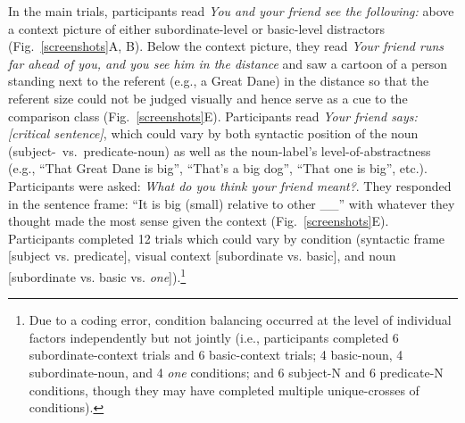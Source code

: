 \documentclass[10pt,letterpaper]{article}
\newcommand{\pt}[1]{\textcolor{Purple}{[pt: #1]}}
\begin{document}
In the main trials, participants read \emph{You and your friend see the following:} above a context picture of either subordinate-level or basic-level distractors (Fig.~\ref{screenshots}A, B). 
Below the context picture, they read \emph{Your friend runs far ahead of you, and you see him in the distance} and saw a cartoon of a person standing next to the referent (e.g., a Great Dane) in the distance so that the referent size could not be judged visually and hence serve as a cue to the comparison class (Fig.~\ref{screenshots}E). 
Participants read \emph{Your friend says: [critical sentence]}, which could vary by both syntactic position of the noun (subject-~vs.~predicate-noun) as well as the noun-label's level-of-abstractness (e.g., ``That Great Dane is big'', ``That's a big dog'', ``That one is big'', etc.). 
Participants were asked: \emph{What do you think your friend meant?}. 
They responded in the sentence frame: “It is big (small) relative to other \_\_” with whatever they thought made the most sense given the context (Fig.~\ref{screenshots}E).
Participants completed 12 trials which could vary by condition (syntactic frame [subject vs. predicate], visual context [subordinate vs. basic], and noun [subordinate vs. basic vs. \emph{one}]).\footnote{Due to a coding error, condition balancing occurred at the level of individual factors independently but not jointly (i.e., participants completed 6 subordinate-context trials and 6 basic-context trials; 4 basic-noun, 4 subordinate-noun, and 4 \emph{one} conditions; and 6 subject-N and 6 predicate-N conditions, though they may have completed multiple unique-crosses of conditions).}
\end{document}
